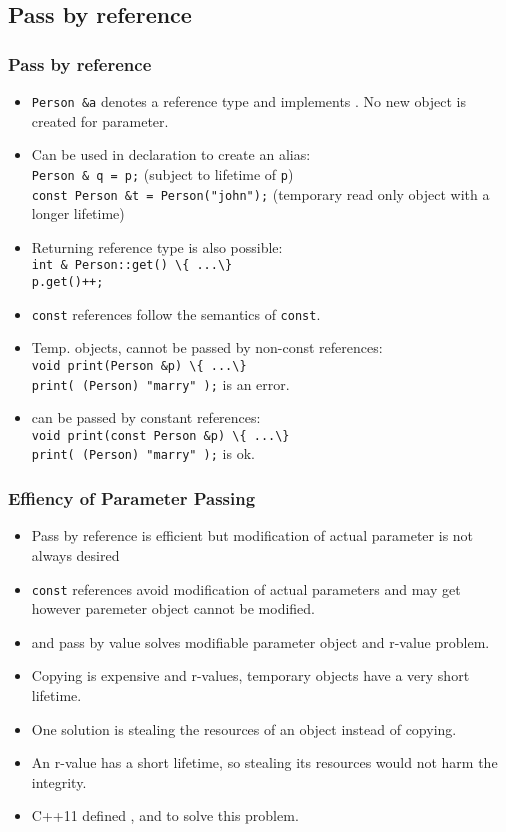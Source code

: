\subsection{Pass by reference}
\begin{frame}
\small
\frametitle{Pass by reference}
\begin{itemize}
\item \lstinline!Person &a! denotes a reference type and implements .
 No new object is created for parameter. 
\item Can be used in declaration to create an alias:\\
\lstinline!Person & q = p;!  {\scriptsize (subject to lifetime of \lstinline!p!)} \\
\lstinline!const Person &t = Person("john");! {\scriptsize (temporary read only object with a longer lifetime)}
\item Returning reference type is also possible:\\
\lstinline!int & Person::get() \{ ...\}!\\
\lstinline!p.get()++;!\\
\item \lstinline!const! references follow the semantics of \lstinline!const!.
\item Temp. objects,  cannot be passed by non-const references:\\
\lstinline!void print(Person &p) \{ ...\}!\\
\lstinline!print( (Person) "marry" );! is an error.
\item {} can be passed by constant references:\\
\lstinline!void print(const Person &p) \{ ...\}!\\
\lstinline!print( (Person) "marry" );! is ok.
\end{itemize}
\end{frame}

\begin{frame}
\frametitle{Effiency of Parameter Passing}
\begin{itemize}
\item Pass by reference is efficient but modification of actual parameter is not always desired
\item \lstinline!const! references avoid modification of actual parameters and may get  however paremeter object cannot be modified.
\item {} and pass by value solves modifiable parameter object and r-value problem. 
\item Copying is expensive and r-values, temporary objects have a very short lifetime. 
\item One solution is stealing the resources of an object instead of copying. 
\item An r-value has a short lifetime, so stealing its resources would not harm the integrity.
\item C++11 defined ,  and  to solve this problem.
\end{itemize}
\end{frame}

